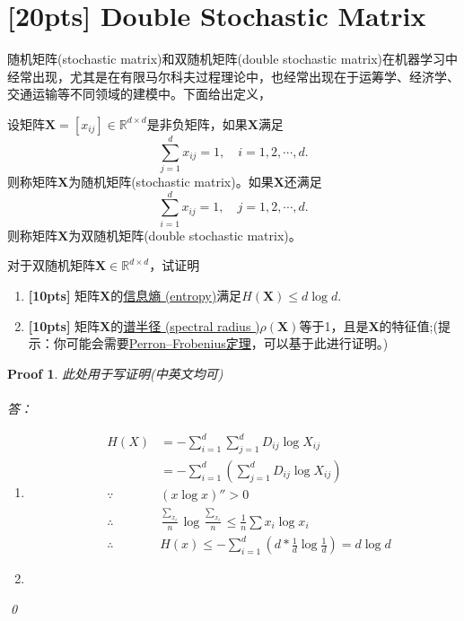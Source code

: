 \documentclass[a4paper,UTF8]{article}
\numberwithin{equation}{section}
\newtheorem*{myProof}{Proof}
\begin{document}
\newpage
\section{[20pts] Double Stochastic Matrix}
随机矩阵(stochastic matrix)和双随机矩阵(double stochastic matrix)在机器学习中经常出现，尤其是在有限马尔科夫过程理论中，也经常出现在于运筹学、经济学、交通运输等不同领域的建模中。下面给出定义，
\begin{def-box}[随机矩阵]
设矩阵$\mathbf{X}=[x_{ij}]\in \mathbb{R}^{d\times d}$是非负矩阵，如果$\mathbf{X}$满足
\begin{equation}
	\label{eq-sto-matrix}
	\sum_{j=1}^d x_{ij} = 1,\quad i=1,2,\cdots,d.
\end{equation}
则称矩阵$\mathbf{X}$为随机矩阵(stochastic matrix)。如果$\mathbf{X}$还满足
\begin{equation}
	\label{eq-double-sto-matrix}
	\sum_{i=1}^d x_{ij} = 1,\quad j=1,2,\cdots,d.
\end{equation}
则称矩阵$\mathbf{X}$为双随机矩阵(double stochastic matrix)。
\end{def-box}
对于双随机矩阵$\mathbf{X} \in \mathbb{R}^{d\times d}$，试证明
\begin{enumerate}[ {(}1{)}]
\item \textbf{[10pts]} 矩阵$\mathbf{X}$的\href{https://en.wikipedia.org/wiki/Entropy_(information_theory)}{信息熵 (entropy)}满足$H(\mathbf{X}) \leq d\log d$.
\item \textbf{[10pts]} 矩阵$\mathbf{X}$的\href{https://en.wikipedia.org/wiki/Spectral_radius}{谱半径 (spectral radius
)}$\rho(\mathbf{X})$等于1，且是$\mathbf{X}$的特征值;(提示：你可能会需要\href{https://en.wikipedia.org/wiki/Perron%E2%80%93Frobenius_theorem}{Perron–Frobenius定理}，可以基于此进行证明。)
\end{enumerate}
\begin{myProof}
此处用于写证明(中英文均可)
~\\
~\\
答：\\
\begin{enumerate}[ {(}1{)}]
\item
\begin{eqnarray*}
	&H(X)&= -\sum_{i=1}^{d}\sum_{j=1}^{d}{D_{ij}\log{X_{ij}}}\\
		 &&= -\sum_{i=1}^{d}(\sum_{j=1}^{d}{D_{ij}\log{X_{ij}}})\\
	&\because &(x\log{x})'' > 0\\
	&\therefore &{\frac{\sum_{x_i}}{n}}\log{{\frac{\sum_{x_i}}{n}}} 
				\leq \frac{1}{n}\sum{x_i\log{x_i}}\\
	&\therefore &H(x) \leq -\sum_{i=1}^{d}
	{(d*\frac{1}{d}\log{\frac{1}{d}})}=d\log{d}
\end{eqnarray*}
\item

\end{enumerate}

\qed
\end{myProof}
\newpage
\end{document}
